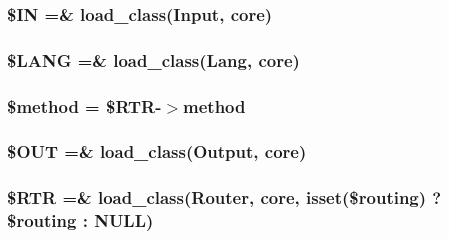\subsubsection[{\$\+I\+N}]{\setlength{\rightskip}{0pt plus 5cm}\$I\+N =\& load\+\_\+class(\textquotesingle{}Input\textquotesingle{}, \textquotesingle{}core\textquotesingle{})}\label{_code_igniter_8php_a66d076d48aff75a01bb726f5bdd94d46}
\hypertarget{_code_igniter_8php_afab4eb732acc05cebf41e0afce18681c}{}
\subsubsection[{\$\+L\+A\+N\+G}]{\setlength{\rightskip}{0pt plus 5cm}\$L\+A\+N\+G =\& load\+\_\+class(\textquotesingle{}Lang\textquotesingle{}, \textquotesingle{}core\textquotesingle{})}\label{_code_igniter_8php_afab4eb732acc05cebf41e0afce18681c}
\hypertarget{_code_igniter_8php_a12661b2fc0f57f97e30a1620889ce9c6}{}
\subsubsection[{\$method}]{\setlength{\rightskip}{0pt plus 5cm}\$method = \$R\+T\+R-\/$>$method}\label{_code_igniter_8php_a12661b2fc0f57f97e30a1620889ce9c6}
\hypertarget{_code_igniter_8php_ad437402616c81c82c746f09854b23729}{}
\subsubsection[{\$\+O\+U\+T}]{\setlength{\rightskip}{0pt plus 5cm}\$O\+U\+T =\& load\+\_\+class(\textquotesingle{}Output\textquotesingle{}, \textquotesingle{}core\textquotesingle{})}\label{_code_igniter_8php_ad437402616c81c82c746f09854b23729}
\hypertarget{_code_igniter_8php_a4d6c9285c8483e4708a57a4128fc95f3}{}
\subsubsection[{\$\+R\+T\+R}]{\setlength{\rightskip}{0pt plus 5cm}\$R\+T\+R =\& load\+\_\+class(\textquotesingle{}Router\textquotesingle{}, \textquotesingle{}core\textquotesingle{}, isset(\$routing) ? \$routing \+: N\+U\+L\+L)}\label{_code_igniter_8php_a4d6c9285c8483e4708a57a4128fc95f3}
\hypertarget{_code_igniter_8php_af78ce53fb82103e1165678dd2d3385a4}{}
